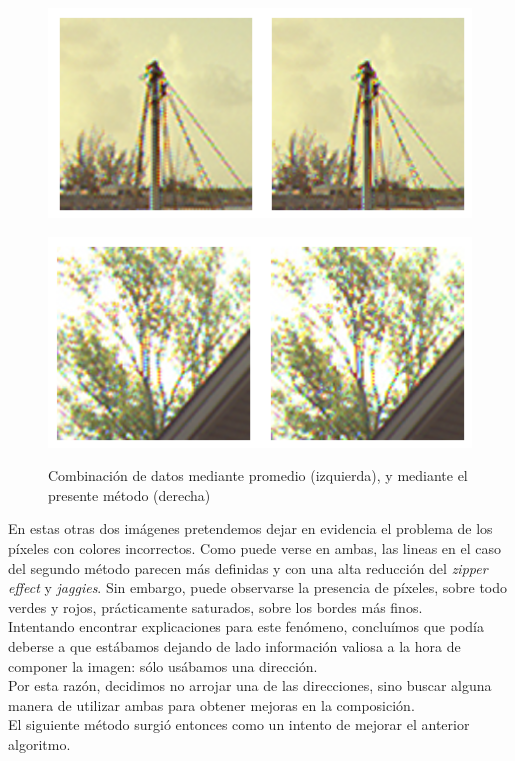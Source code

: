 \documentclass[a4paper]{article}
\begin{document}
\begin{figure}[h!]
	\begin{center}
	    \includegraphics[scale=0.47]{imagenes/Splines/RecortesSplines/pesos1y0/barco1.png}\\
	\end{center}
	\begin{center}
	    \includegraphics[scale=0.47]{imagenes/Splines/RecortesSplines/pesos1y0/arbol.png}\\
	\end{center}
	\caption{Combinación de datos mediante promedio (izquierda), y mediante el presente método (derecha)}
	\label{splines3}
\end{figure}
\pagebreak
En estas otras dos imágenes pretendemos dejar en evidencia el problema de los píxeles con colores incorrectos. Como puede verse en ambas, las lineas en el caso del segundo método parecen más definidas y con una alta reducción del \textit{zipper effect} y \textit{jaggies}. Sin embargo, puede observarse la presencia de píxeles, sobre todo verdes y rojos, prácticamente saturados, sobre los bordes más finos. \\

Intentando encontrar explicaciones para este fenómeno, concluímos que podía deberse a que estábamos dejando de lado información valiosa a la hora de componer la imagen: sólo usábamos una dirección.\\
\indent Por esta razón, decidimos no arrojar una de las direcciones, sino buscar alguna manera de utilizar ambas para obtener mejoras en la composición.\\
El siguiente método surgió entonces como un intento de mejorar el anterior algoritmo.\\
\end{document}
